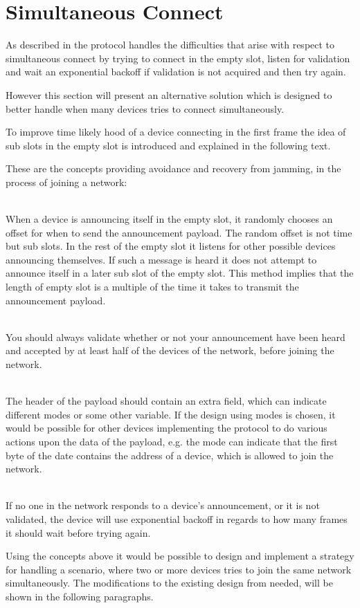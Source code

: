 \section{Simultaneous Connect}
As described in  the protocol handles the difficulties that arise with respect to simultaneous connect by trying to connect in the empty slot, listen for validation and wait an exponential backoff if validation is not acquired and then try again.

However this section will present an alternative solution which is designed to better handle when many devices tries to connect simultaneously.

To improve time likely hood of a device connecting in the first frame the idea of sub slots in the empty slot is introduced and explained in the following text.

These are the concepts providing avoidance and recovery from jamming, in the process of joining a network: 
\begin{description}[labelindent=\parindent]
    \item[Random Offset]\hfill\\
    When a device is announcing itself in the empty slot, it randomly chooses an offset for when to send the announcement payload.
    The random offset is not time but sub slots. 
    In the rest of the empty slot it listens for other possible devices announcing themselves.
    If such a message is heard it does not attempt to announce itself in a later sub slot of the empty slot.
    This method implies that the length of empty slot is a multiple of the time it takes to transmit the announcement payload.
    \item[Validation]\hfill\\
    You should always validate whether or not your announcement have been heard and accepted by at least half of the devices of the network, before joining the network.
    \item[Payload Mode]\hfill\\
    The header of the payload should contain an extra field, which can indicate different modes or some other variable.
    If the design using modes is chosen, it would be possible for other devices implementing the protocol to do various actions upon the data of the payload, e.g. the mode can indicate that the first byte of the date contains the address of a device, which is allowed to join the network.
    \item[Exponential Backoff]\hfill\\ 
    If no one in the network responds to a device's announcement, or it is not validated, the device will use exponential backoff in regards to how many frames it should wait before trying again.
\end{description} 
\noindent
Using the concepts above it would be possible to design and implement a strategy for handling a scenario, where two or more devices tries to join the same network simultaneously.
The modifications to the existing design from  needed, will be shown in the following paragraphs.

